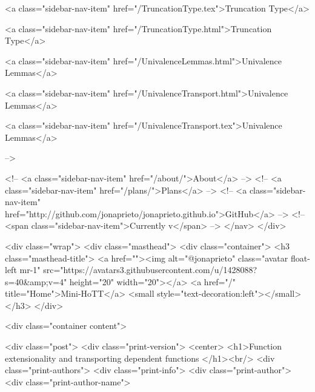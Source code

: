       
    
      
        
          <a class="sidebar-nav-item" href="/TruncationType.tex">Truncation Type</a>
        
      
    
      
        
          <a class="sidebar-nav-item" href="/TruncationType.html">Truncation Type</a>
        
      
    
      
        
          <a class="sidebar-nav-item" href="/UnivalenceLemmas.html">Univalence Lemmas</a>
        
      
    
      
        
          <a class="sidebar-nav-item" href="/UnivalenceTransport.html">Univalence Lemmas</a>
        
      
    
      
        
          <a class="sidebar-nav-item" href="/UnivalenceTransport.tex">Univalence Lemmas</a>
        
      
     -->

    <!-- <a class="sidebar-nav-item" href="/about/">About</a> -->
    <!-- <a class="sidebar-nav-item" href="/plans/">Plans</a> -->
    <!-- <a class="sidebar-nav-item" href="http://github.com/jonaprieto/jonaprieto.github.io">GitHub</a> -->
    <!-- <span class="sidebar-nav-item">Currently v</span> -->
  </nav>
</div>

    <div class="wrap">
      <div class="masthead">
        <div class="container">
          <h3 class="masthead-title">
            <a href=""><img alt="@jonaprieto" class="avatar float-left mr-1" src="https://avatars3.githubusercontent.com/u/1428088?s=40&amp;v=4" height="20" width="20"></a>
            <a href="/" title="Home">Mini-HoTT</a>
            <small style="text-decoration:left"></small>
          </h3>
        </div>
      
      <div class="container content">
        







<div class="post">
  <div class="print-version">
    <center>
      <h1>Function extensionality and transporting dependent functions </h1><br/>
        <div class="print-authors">
          <div class="print-info">
            <div class="print-author">
              <div class="print-author-name">
                
